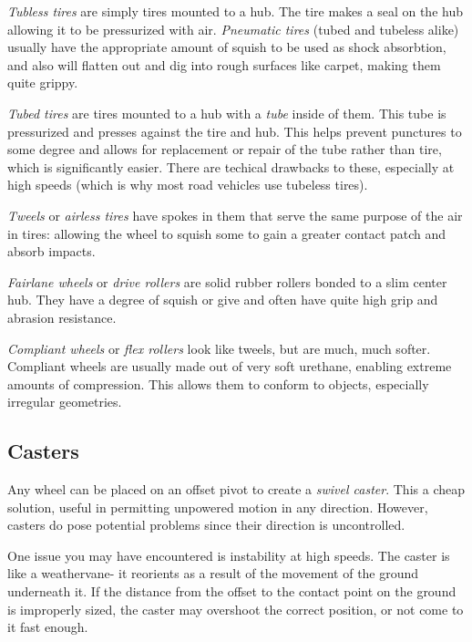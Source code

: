 	\begin{asparaenum}[a)] 
		\item \textit{Tubless tires} are simply tires mounted to a hub. The tire makes a seal on the hub allowing it to be pressurized with air. \textit{Pneumatic tires} (tubed and tubeless alike) usually have the appropriate amount of squish to be used as shock absorbtion, and also will flatten out and dig into rough surfaces like carpet, making them quite grippy.
		\item \textit{Tubed tires} are tires mounted to a hub with a \textit{tube} inside of them. This tube is pressurized and presses against the tire and hub. This helps prevent punctures to some degree and allows for replacement or repair of the tube rather than tire, which is significantly easier. There are techical drawbacks to these, especially at high speeds (which is why most road vehicles use tubeless tires).	
		\item \textit{Tweels} or \textit{airless tires} have spokes in them that serve the same purpose of the air in tires: allowing the wheel to squish some to gain a greater contact patch and absorb impacts.
		\item \textit{Fairlane wheels} or \textit{drive rollers} are solid rubber rollers bonded to a slim center hub. They have a degree of squish or give and often have quite high grip and abrasion resistance.
		\item \textit{Compliant wheels} or \textit{flex rollers} look like tweels, but are much, much softer. Compliant wheels are usually made out of very soft urethane, enabling extreme amounts of compression. This allows them to conform to objects, especially irregular geometries.
	\end{asparaenum}
	
	\subsection{Casters}

	Any wheel can be placed on an offset pivot to create a \textit{swivel caster}. This a cheap solution, useful in permitting unpowered motion in any direction. However, casters do pose potential problems since their direction is uncontrolled.

	One issue you may have encountered is instability at high speeds. The caster is like a weathervane- it reorients as a result of the movement of the ground underneath it. If the distance from the offset to the contact point on the ground is improperly sized, the caster may overshoot the correct position, or not come to it fast enough.

